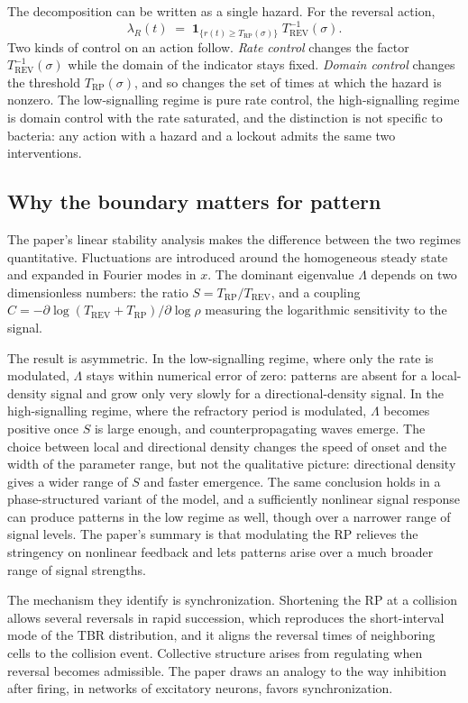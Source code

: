 \documentclass[11pt]{article}
\theoremstyle{definition}
\theoremstyle{remark}
\newcommand{\Trp}{T_{\mathrm{RP}}}
\newcommand{\Trev}{T_{\mathrm{REV}}}
\begin{document}
The decomposition can be written as a single hazard. For the reversal action,
\begin{equation}
  \lambda_R(t) \;=\; \mathbf{1}_{\{r(t)\ge \Trp(\sigma)\}}\;\Trev^{-1}(\sigma).
  \label{eq:hazard}
\end{equation}
Two kinds of control on an action follow. \emph{Rate control} changes the factor $\Trev^{-1}(\sigma)$ while the domain of the indicator stays fixed. \emph{Domain control} changes the threshold $\Trp(\sigma)$, and so changes the set of times at which the hazard is nonzero. The low-signalling regime is pure rate control, the high-signalling regime is domain control with the rate saturated, and the distinction is not specific to bacteria: any action with a hazard and a lockout admits the same two interventions.

\subsection{Why the boundary matters for pattern}

The paper's linear stability analysis makes the difference between the two regimes quantitative. Fluctuations are introduced around the homogeneous steady state and expanded in Fourier modes in $x$. The dominant eigenvalue $\Lambda$ depends on two dimensionless numbers: the ratio $S=\Trp/\Trev$, and a coupling $C=-\partial\log(\Trev+\Trp)/\partial\log\rho$ measuring the logarithmic sensitivity to the signal.

The result is asymmetric. In the low-signalling regime, where only the rate is modulated, $\Lambda$ stays within numerical error of zero: patterns are absent for a local-density signal and grow only very slowly for a directional-density signal. In the high-signalling regime, where the refractory period is modulated, $\Lambda$ becomes positive once $S$ is large enough, and counterpropagating waves emerge. The choice between local and directional density changes the speed of onset and the width of the parameter range, but not the qualitative picture: directional density gives a wider range of $S$ and faster emergence. The same conclusion holds in a phase-structured variant of the model, and a sufficiently nonlinear signal response can produce patterns in the low regime as well, though over a narrower range of signal levels. The paper's summary is that modulating the RP relieves the stringency on nonlinear feedback and lets patterns arise over a much broader range of signal strengths.

The mechanism they identify is synchronization. Shortening the RP at a collision allows several reversals in rapid succession, which reproduces the short-interval mode of the TBR distribution, and it aligns the reversal times of neighboring cells to the collision event. Collective structure arises from regulating when reversal becomes admissible. The paper draws an analogy to the way inhibition after firing, in networks of excitatory neurons, favors synchronization.
\end{document}

